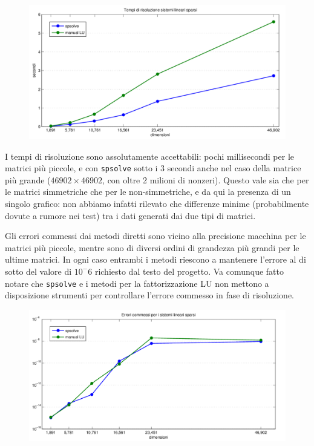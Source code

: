 \documentclass[11pt,a4paper]{scrartcl}
\begin{document}
\begin{figure}[!ht]
\centering
\includegraphics[scale=0.50]{images/tempi_diretti} 
\end{figure}

I tempi di risoluzione sono assolutamente accettabili: pochi millisecondi per le matrici più piccole, e con \texttt{spsolve} sotto i 3 secondi anche nel caso della matrice più grande ($46902 \times 46902$, con oltre 2 milioni di nonzeri). Questo vale sia che per le matrici simmetriche che per le non-simmetriche, e da qui la presenza di un singolo grafico: non abbiamo infatti rilevato che differenze minime (probabilmente dovute a rumore nei test) tra i dati generati dai due tipi di matrici.

Gli errori commessi dai metodi diretti sono vicino alla precisione macchina per le matrici più piccole, mentre sono di diversi ordini di grandezza più grandi per le ultime matrici. In ogni caso entrambi i metodi riescono a mantenere l'errore al di sotto del valore di $10^-6$ richiesto dal testo del progetto. Va comunque fatto notare che \texttt{spsolve} e i metodi per la fattorizzazione LU non mettono a disposizione strumenti per controllare l'errore commesso in fase di risoluzione.

\begin{figure}[!H]
\centering
\includegraphics[scale=0.50]{images/errori_diretti} 
\end{figure}
\end{document}
